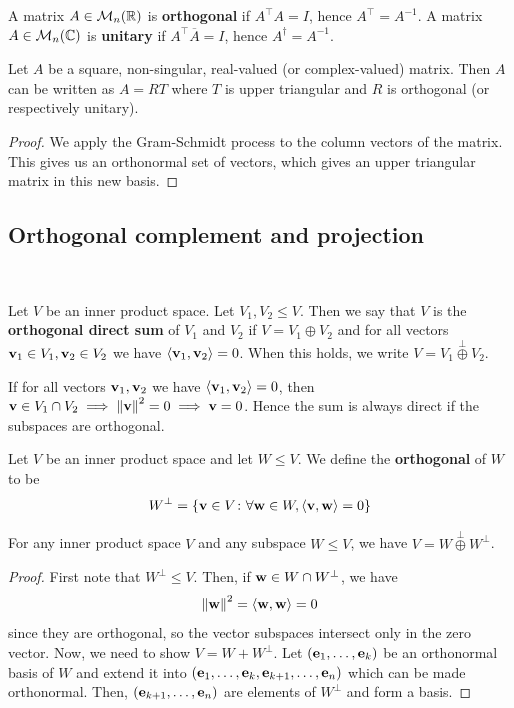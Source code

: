 \documentclass[a4paper]{article}
\begin{document}
\begin{definition}
	A matrix \( A \in {\mathcal{M}}_n(\mathbb R) \) is \textbf{orthogonal} if \( A^\top A = I \), hence \( A^\top = A^{-1} \).
	A matrix \( A \in {\mathcal{M}}_n(\mathbb C) \) is \textbf{unitary} if \( A^\top \overline A = I \), hence \( A^\dagger = A^{-1} \).
\end{definition}
\begin{proposition}
	Let \( A \) be a square, non-singular, real-valued (or complex-valued) matrix.
	Then \( A \) can be written as \( A = RT \) where \( T \) is upper triangular and \( R \) is orthogonal (or respectively unitary).
\end{proposition}
\begin{proof}
	We apply the Gram-Schmidt process to the column vectors of the matrix.
	This gives us an orthonormal set of vectors, which gives an upper triangular matrix in this new basis.
\end{proof}

\subsection{Orthogonal complement and projection}
\ \vspace*{-1.5em}
\begin{definition}
	Let \( V \) be an inner product space.
	Let \( V_1, V_2 \leq V \).
	Then we say that \( V \) is the \textbf{orthogonal direct sum} of \( V_1 \) and \( V_2 \) if \( V = V_1 \oplus V_2 \) and for all vectors \( {\bf v}_1\in V_1, {\bf v}_2\in V_2 \) we have \( \left\langle{{\bf v}_1, {\bf v}_2}\right\rangle = 0 \).
	When this holds, we write \( V = V_1 \overset{\perp}{\oplus} V_2 \).
\end{definition}
\begin{remark}
	If for all vectors \( {\bf v}_1, {\bf v}_2 \) we have \( \left\langle{{\bf v}_1, {\bf v}_2}\right\rangle = 0 \), then \( {\bf v} \in V_1 \cap V_2 \implies \norm{{\bf v}}^2 = 0 \implies {\bf v} = 0 \).
	Hence the sum is always direct if the subspaces are orthogonal.
\end{remark}
\begin{definition}
	Let \( V \) be an inner product space and let \( W \leq V \).
	We define the \textbf{orthogonal} of \( W \) to be
	\[
		W^\perp = \qty{{\bf v}\in V \colon \forall {\bf w}\in W, \left\langle{{\bf v},{\bf w}}\right\rangle = 0}
	\]
\end{definition}
\begin{lemma}
	For any inner product space \( V \) and any subspace \( W \leq V \), we have \( V = W \overset{\perp}{\oplus} W^\perp \).
\end{lemma}
\begin{proof}
	First note that \( W^\perp \leq V \).
	Then, if \( {\bf w} \in W \cap W^\perp \), we have
	\[
		\norm{{\bf w}}^2 = \left\langle{{\bf w}, {\bf w}}\right\rangle = 0
	\]
	since they are orthogonal, so the vector subspaces intersect only in the zero vector.
	Now, we need to show \( V = W + W^\perp \).
	Let \( ({\bf e}_1, \dots, {\bf e}_k) \) be an orthonormal basis of \( W \) and extend it into \( ({\bf e}_1, \dots, {\bf e}_k, {\bf e}_{k+1}, \dots, {\bf e}_n) \) which can be made orthonormal.
	Then, \( ({\bf e}_{k+1}, \dots, {\bf e}_n) \) are elements of \( W^\perp \) and form a basis.
\end{proof}
\end{document}

